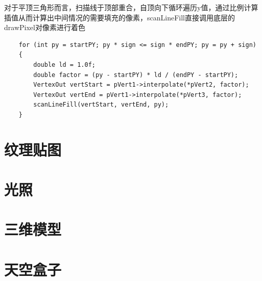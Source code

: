     \begin{spacing}{2.5}
    对于平顶三角形而言，扫描线于顶部重合，自顶向下循环遍历y值，通过比例计算插值从而计算出中间情况的需要填充的像素，scanLineFill直接调用底层的drawPixel对像素进行着色
    
    	
    \end{spacing}

	\begin{lstlisting}
    for (int py = startPY; py * sign <= sign * endPY; py = py + sign)
    {
    	double ld = 1.0f;
       	double factor = (py - startPY) * ld / (endPY - startPY);
       	VertexOut vertStart = pVert1->interpolate(*pVert2, factor);
       	VertexOut vertEnd = pVert1->interpolate(*pVert3, factor);
       	scanLineFill(vertStart, vertEnd, py);
   	}
	\end{lstlisting}


    \section{纹理贴图}
    
    \section{光照}
    
    \section{三维模型}
    
    \section{天空盒子}

